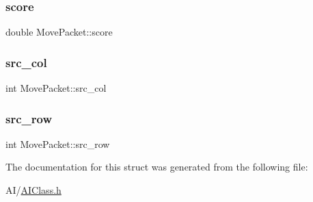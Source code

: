 \mbox{\label{struct_move_packet_ae502e180cfc98f90b24b9d5521f80161}} 
\subsubsection{\texorpdfstring{score}{score}}
{\footnotesize\ttfamily double Move\+Packet\+::score}

\mbox{\label{struct_move_packet_a174bf6f0d24a094e8cd3a8af0547dc9f}} 
\subsubsection{\texorpdfstring{src\+\_\+col}{src\_col}}
{\footnotesize\ttfamily int Move\+Packet\+::src\+\_\+col}

\mbox{\label{struct_move_packet_ac47381c0c93b204e2e9a8251537f0118}} 
\subsubsection{\texorpdfstring{src\+\_\+row}{src\_row}}
{\footnotesize\ttfamily int Move\+Packet\+::src\+\_\+row}



The documentation for this struct was generated from the following file\+:\begin{DoxyCompactItemize}
\item 
A\+I/\hyperlink{_a_i_class_8h}{A\+I\+Class.\+h}\end{DoxyCompactItemize}
